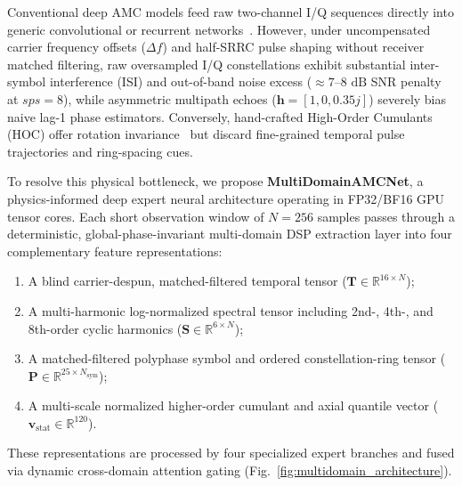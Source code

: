 Conventional deep AMC models feed raw two-channel I/Q sequences directly into generic convolutional or recurrent networks~\cite{sathyanarayanan2023rml22, guo2025fewer}. However, under uncompensated carrier frequency offsets ($\Delta f$) and half-SRRC pulse shaping without receiver matched filtering, raw oversampled I/Q constellations exhibit substantial inter-symbol interference (ISI) and out-of-band noise excess ($\approx 7\text{--}8\text{ dB}$ SNR penalty at $sps=8$), while asymmetric multipath echoes ($\mathbf{h} = [1, 0, 0.35j]$) severely bias naive lag-1 phase estimators. Conversely, hand-crafted High-Order Cumulants (HOC) offer rotation invariance~\cite{xia2026optimal} but discard fine-grained temporal pulse trajectories and ring-spacing cues.

To resolve this physical bottleneck, we propose \textbf{MultiDomainAMCNet}, a physics-informed deep expert neural architecture operating in FP32/BF16 GPU tensor cores. Each short observation window of $N=256$ samples passes through a deterministic, global-phase-invariant multi-domain DSP extraction layer into four complementary feature representations:
\begin{enumerate}
    \item A blind carrier-despun, matched-filtered temporal tensor ($\mathbf{T} \in \mathbb{R}^{16 \times N}$);
    \item A multi-harmonic log-normalized spectral tensor including 2nd-, 4th-, and 8th-order cyclic harmonics ($\mathbf{S} \in \mathbb{R}^{6 \times N}$);
    \item A matched-filtered polyphase symbol and ordered constellation-ring tensor ($\mathbf{P} \in \mathbb{R}^{25 \times N_{\text{sym}}}$);
    \item A multi-scale normalized higher-order cumulant and axial quantile vector ($\mathbf{v}_{\text{stat}} \in \mathbb{R}^{120}$).
\end{enumerate}
These representations are processed by four specialized expert branches and fused via dynamic cross-domain attention gating (Fig.~\ref{fig:multidomain_architecture}).

